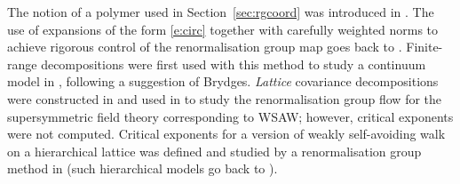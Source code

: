 The notion of a polymer used in Section~\ref{sec:rgcoord} was introduced in
\cite{GK71}. The use of expansions of the form \eqref{e:circ} together with
carefully weighted norms to achieve rigorous control of the renormalisation
group map goes back to \cite{BY90}.
Finite-range decompositions were first used with this method to study a
continuum model in
\cite{MS00}, following a suggestion of Brydges. \emph{Lattice} covariance
decompositions were constructed in \cite{BGM04} and used in
\cite{MS08} to study the renormalisation group flow for the supersymmetric
field theory corresponding to WSAW; however, critical exponents were not
computed.
Critical exponents for a version of weakly self-avoiding walk on a hierarchical
lattice was defined and studied by a renormalisation group method in
\cite{BEI92,BI03c,BI03d} (such hierarchical models go back to \cite{Dyso69}).
